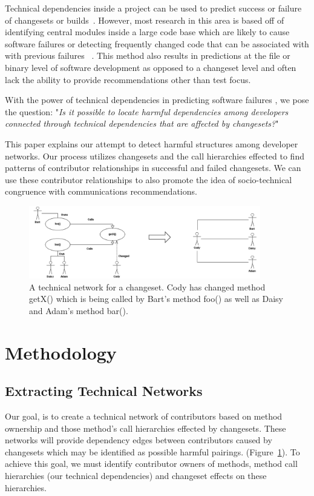 \documentclass[conference]{IEEEtran}
\begin{document}
Technical dependencies inside a project can be used to predict success or failure of 
changesets or builds~\cite{Pinzger:2008:DNP, Zimmermann:2008:PDU}. However, most 
research in this area is based off of identifying
central modules inside a large code base which are likely to cause software failures or
detecting frequently changed code that can be associated with with previous failures
~\cite{Kim:2006:AIB}. 
This method also results in predictions 
at the file or binary level of software development as opposed to a changeset level
and often lack the ability to provide recommendations other than test focus.

With the power of technical dependencies in predicting software failures , we pose the question: 
"\textit{Is it possible to locate harmful dependencies among developers connected through 
technical dependencies that are affected by changesets?}"

This paper explains our attempt to detect harmful structures among developer networks.
Our process utilizes changesets and the call hierarchies effected  to find patterns of contributor 
relationships in successful and failed changesets.  We can use these contributor relationships 
to also promote the idea of socio-technical congruence with communications recommendations.

\begin{figure}[tb!]
\centering
\includegraphics[width=0.9\textwidth]{images/TecNetwork}
\caption{A technical network for a changeset. Cody has changed method getX() which is being
called by Bart's method foo() as well as Daisy and Adam's method bar().\label{fig:network}}
\end{figure}

\section{Methodology}

\subsection{Extracting Technical Networks}
Our goal, is to create a technical network of contributors based on method ownership
and those method's call hierarchies effected by changesets. These networks will provide
dependency edges between contributors caused by changesets which may be 
identified as possible harmful pairings. (Figure~\ref{fig:network}). To achieve this goal,
we must identify contributor owners of methods, method call hierarchies (our technical
dependencies) and changeset effects on these hierarchies.
\end{document}

